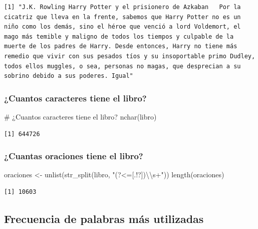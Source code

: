 \documentclass[
  letterpaper,
  DIV=11,
  numbers=noendperiod]{scrreprt}
\newenvironment{Shaded}{\begin{snugshade}}{\end{snugshade}}
\newcommand{\CommentTok}[1]{\textcolor[rgb]{0.37,0.37,0.37}{#1}}
\newcommand{\FunctionTok}[1]{\textcolor[rgb]{0.28,0.35,0.67}{#1}}
\newcommand{\NormalTok}[1]{\textcolor[rgb]{0.00,0.23,0.31}{#1}}
\newcommand{\OtherTok}[1]{\textcolor[rgb]{0.00,0.23,0.31}{#1}}
\newcommand{\SpecialCharTok}[1]{\textcolor[rgb]{0.37,0.37,0.37}{#1}}
\newcommand{\StringTok}[1]{\textcolor[rgb]{0.13,0.47,0.30}{#1}}
\begin{document}
\begin{verbatim}
[1] "J.K. Rowling Harry Potter y el prisionero de Azkaban   Por la cicatriz que lleva en la frente, sabemos que Harry Potter no es un niño como los demás, sino el héroe que venció a lord Voldemort, el mago más temible y maligno de todos los tiempos y culpable de la muerte de los padres de Harry. Desde entonces, Harry no tiene más remedio que vivir con sus pesados tíos y su insoportable primo Dudley, todos ellos muggles, o sea, personas no magas, que desprecian a su sobrino debido a sus poderes. Igual"
\end{verbatim}

\subsubsection{¿Cuantos caracteres tiene el
libro?}\label{cuantos-caracteres-tiene-el-libro}

\begin{Shaded}
\begin{Highlighting}[]
\CommentTok{\# ¿Cuantos caracteres tiene el libro? }
\FunctionTok{nchar}\NormalTok{(libro)}
\end{Highlighting}
\end{Shaded}

\begin{verbatim}
[1] 644726
\end{verbatim}

\subsubsection{¿Cuantas oraciones tiene el
libro?}\label{cuantas-oraciones-tiene-el-libro}

\begin{Shaded}
\begin{Highlighting}[]
\NormalTok{oraciones }\OtherTok{\textless{}{-}} \FunctionTok{unlist}\NormalTok{(}\FunctionTok{str\_split}\NormalTok{(libro, }\StringTok{"(?\textless{}=[.!?])}\SpecialCharTok{\textbackslash{}\textbackslash{}}\StringTok{s+"}\NormalTok{))}
\FunctionTok{length}\NormalTok{(oraciones)}
\end{Highlighting}
\end{Shaded}

\begin{verbatim}
[1] 10603
\end{verbatim}

\subsection{Frecuencia de palabras más
utilizadas}\label{frecuencia-de-palabras-muxe1s-utilizadas}
\end{document}
